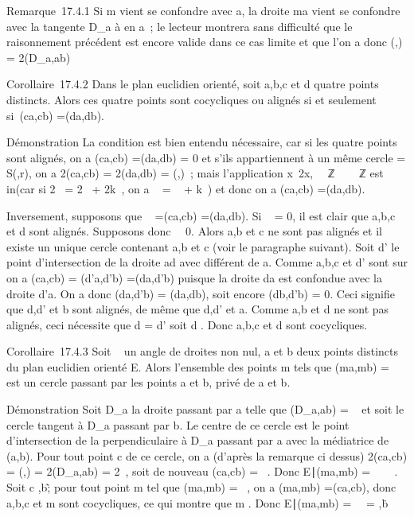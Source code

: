 \documentclass[]{article}
\begin{document}
Remarque~17.4.1 Si m vient se confondre avec a, la droite ma vient se
confondre avec la tangente D\_a à \Gamma en a~; le lecteur montrera
sans difficulté que le raisonnement précédent est encore valide dans ce
cas limite et que l'on a donc
\widehat(\overrightarrow\omegaa,\overrightarrow\omegab)
= 2\widehat(D\_a,ab)

Corollaire~17.4.2 Dans le plan euclidien orienté, soit a,b,c et d quatre
points distincts. Alors ces quatre points sont cocycliques ou alignés si
et seulement si~\widehat(ca,cb)
=\widehat (da,db).

Démonstration La condition est bien entendu nécessaire, car si les
quatre points sont alignés, on a \widehat(ca,cb)
=\widehat (da,db) = 0 et s'ils appartiennent à un
même cercle \Gamma = S(\omega,r), on a 2\widehat(ca,cb) =
2\widehat(da,db) =\widehat
(\overrightarrow\omegaa,\overrightarrow\omegab)~;
mais l'application x\mapsto~2x, ~\diagup\pi~ℤ \rightarrow~ ~\pi~ℤ est
in\jmathective (car si 2\alpha~ = 2\beta~ + 2k\pi~, on a \alpha~ = \beta~ + k\pi~) et donc on a
\widehat(ca,cb) =\widehat (da,db).

Inversement, supposons que \alpha~ =\widehat (ca,cb)
=\widehat (da,db). Si \alpha~ = 0, il est clair que a,b,c
et d sont alignés. Supposons donc \alpha~\neq~0. Alors
a,b et c ne sont pas alignés et il existe un unique cercle \Gamma contenant
a,b et c (voir le paragraphe suivant). Soit d' le point d'intersection
de la droite ad avec \Gamma différent de a. Comme a,b,c et d' sont sur \Gamma on a
\widehat(ca,cb) =\widehat
(d'a,d'b) =\widehat (da,d'b) puisque la droite da
est confondue avec la droite d'a. On a donc
\widehat(da,d'b) =\widehat
(da,db), soit encore \widehat(db,d'b) = 0. Ceci
signifie que d,d' et b sont alignés, de même que d,d' et a. Comme a,b et
d ne sont pas alignés, ceci nécessite que d = d' soit d \in \Gamma. Donc a,b,c
et d sont cocycliques.

Corollaire~17.4.3 Soit \alpha~ un angle de droites non nul, a et b deux points
distincts du plan euclidien orienté E. Alors l'ensemble des points m
tels que \widehat(ma,mb) = \alpha~ est un cercle passant
par les points a et b, privé de a et b.

Démonstration Soit D\_a la droite passant par a telle que
\widehat(D\_a,ab) = \alpha~ et soit \Gamma le cercle
tangent à D\_a passant par b. Le centre \omega de ce cercle est le
point d'intersection de la perpendiculaire à D\_a passant par a
avec la médiatrice de (a,b). Pour tout point c de ce cercle, on a
(d'après la remarque ci dessus) 2\widehat(ca,cb)
=\widehat
(\overrightarrow\omegaa,\overrightarrow\omegab)
= 2\widehat(D\_a,ab) = 2\alpha~, soit de nouveau
\widehat(ca,cb) = \alpha~. Donc \m \in
E∣\widehat(ma,mb) =
\alpha~\ \subset~ \Gamma. Soit c \in \Gamma
\diagdown\a,b\~; pour tout point m tel que
\widehat(ma,mb) = \alpha~, on a
\widehat(ma,mb) =\widehat (ca,cb),
donc a,b,c et m sont cocycliques, ce qui montre que m \in \Gamma. Donc
\m \in
E∣\widehat(ma,mb) =
\alpha~\ = \Gamma \diagdown\a,b\.
\end{document}
